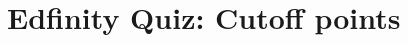 \documentclass[slidestop,compress,mathserif]{beamer}
\makeatletter
\def\chp4@path{../../Chp 4}
\makeatother
\begin{document}


\section{Edfinity Quiz: Cutoff points}










\end{document}
